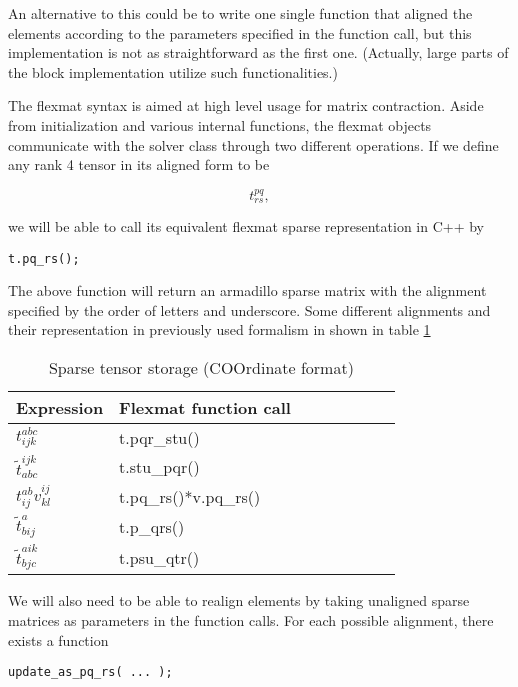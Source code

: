 An alternative to this could be to write one single function that aligned the elements according to the parameters specified in the function call, but this implementation is not as straightforward as the first one. (Actually, large parts of the block implementation utilize such functionalities.)

The flexmat syntax is aimed at high level usage for matrix contraction. Aside from initialization and various internal functions, the flexmat objects communicate with the solver class through two different operations. If we define any rank 4 tensor in its aligned form to be

\begin{equation}
t^{pq}_{rs} ,
\end{equation}

we will be able to call its equivalent flexmat sparse representation in C++ by

\begin{verbatim}
t.pq_rs(); 
\end{verbatim}

The above function will return an armadillo sparse matrix with the alignment specified by the order of letters and underscore. Some different alignments and their representation in previously used formalism in shown in table \ref{tab:sparse_alignments}

\begin{table}[]
\centering
\caption{Sparse tensor storage (COOrdinate format)}
\label{tab:sparse_alignments}
\begin{tabular}{llllllll}
Expression & Flexmat function call \\ \hline
$t^{abc}_{ijk}$ & t.pqr\_stu() \\
$\tilde{t}^{ijk}_{abc}$ & t.stu\_pqr() \\
$t^{ab}_{ij} v^{ij}_{kl}$ & t.pq\_rs()*v.pq\_rs() \\
$\tilde{t}^a_{bij}$ & t.p\_qrs() \\
$\tilde{t}^{aik}_{bjc}$ & t.psu\_qtr() \\
\end{tabular}
\end{table}

We will also need to be able to realign elements by taking unaligned sparse matrices as parameters in the function calls. For each possible alignment, there exists a function

\begin{verbatim}
update_as_pq_rs( ... );
\end{verbatim}

